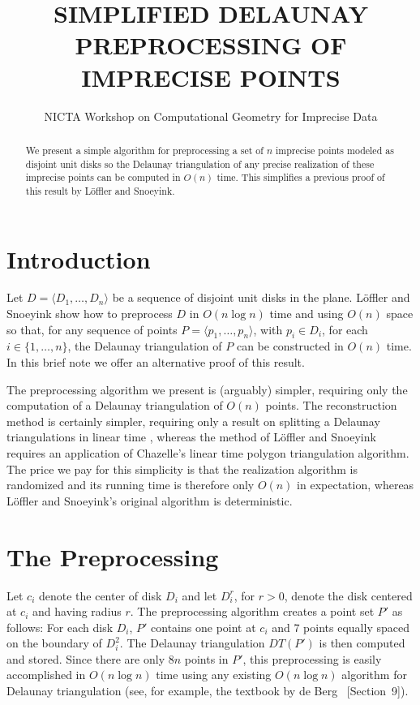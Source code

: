 \documentclass[lotsofwhite]{patmorin}
\title{\MakeUppercase{Simplified Delaunay Preprocessing of Imprecise Points}}
\author{NICTA Workshop on Computational Geometry for Imprecise Data}
\begin{document}
\maketitle

\begin{abstract}
We present a simple algorithm for preprocessing a set of $n$ imprecise
points modeled as disjoint unit disks so the Delaunay triangulation of
any precise realization of these imprecise points can be computed in
$O(n)$ time.  This simplifies a previous proof of this result by
L\"offler and Snoeyink.
\end{abstract}

\section{Introduction}

Let $D=\langle D_1,\ldots,D_n\rangle$ be a sequence of disjoint unit
disks in the plane.  L\"offler and Snoeyink \cite{ls08} show how to
preprocess $D$ in $O(n\log n)$ time and using $O(n)$ space so that,
for any sequence of points $P=\langle p_1,\ldots,p_n\rangle$, with
$p_i\in D_i$, for each $i\in\{1,\ldots,n\}$, the Delaunay triangulation
of $P$ can be constructed in $O(n)$ time.  In this brief note we offer
an alternative proof of this result.

The preprocessing algorithm we present is (arguably) simpler,
requiring only the computation of a Delaunay triangulation of $O(n)$
points.  The reconstruction method is certainly simpler, requiring
only a result on splitting a Delaunay triangulations in linear time
\cite{cdhmst02}, whereas the method of L\"offler and Snoeyink requires an
application of Chazelle's linear time polygon triangulation algorithm.
The price we pay for this simplicity is that the realization algorithm
is randomized and its running time is therefore only $O(n)$ in
expectation, whereas L\"offler and Snoeyink's original algorithm is
deterministic.

\section{The Preprocessing}

Let $c_i$ denote the center of disk $D_i$ and let $D_i^r$, for $r >0$,
denote the disk centered at $c_i$ and having radius $r$.  The
preprocessing algorithm creates a point set $P'$ as follows:  For each
disk $D_i$, $P'$ contains one point at $c_i$ and 7 points equally
spaced on the boundary of $D_i^2$. The Delaunay triangulation $DT(P')$
is then computed and stored.  Since there are only $8n$ points in
$P'$, this preprocessing is easily accomplished in $O(n\log n)$ time
using any existing $O(n\log n)$ algorithm for Delaunay triangulation
(see, for example, the textbook by de Berg \etal\
\cite{bcko08}[Section~9]).
\end{document}
